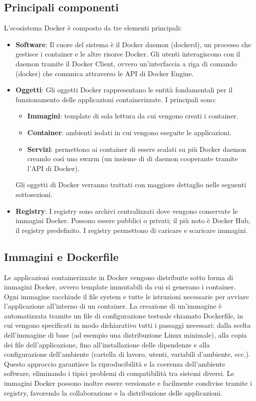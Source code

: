 \subsection{Principali componenti}
\label{sec:principalicomponenti}

L’ecosistema Docker è composto da tre elementi principali:


\begin{itemize}
    \item \textbf{Software}: Il cuore del sistema è il Docker daemon (dockerd), un processo che gestisce i container e le altre risorse Docker. Gli utenti interagiscono con il daemon tramite il Docker Client, ovvero un'interfaccia a riga di comando (docker) che comunica attraverso le API di Docker Engine.
    \item \textbf{Oggetti}: Gli oggetti Docker rappresentano le entità fondamentali per il funzionamento delle applicazioni containerizzate. I principali sono:
    \begin{itemize}
        \item \textbf{Immagini}: template di sola lettura da cui vengono creati i container.
        \item \textbf{Container}: ambienti isolati in cui vengono eseguite le applicazioni.
        \item \textbf{Servizi}: permettono ai container di essere scalati su più Docker daemon creando così uno swarm (un insieme di di daemon cooperante tramite l'API di Docker).
    \end{itemize}
    Gli oggetti di Docker verranno trattati con maggiore dettaglio nelle seguenti sottosezioni.
    \item \textbf{Registry}: I registry sono archivi centralizzati dove vengono conservate le immagini Docker. Possono essere pubblici o privati; il più noto è Docker Hub, il registry predefinito. I registry permettono di caricare e scaricare immagini.
\end{itemize}


\subsection{Immagini e Dockerfile}
\label{sec:immaginiedockerfile}
Le applicazioni containerizzate in Docker vengono distribuite sotto forma di immagini Docker, ovvero template immutabili da cui si generano i container. Ogni immagine racchiude il file system e tutte le istruzioni necessarie per avviare l’applicazione all’interno di un container. La creazione di un’immagine è automatizzata tramite un file di configurazione testuale chiamato Dockerfile, in cui vengono specificati in modo dichiarativo tutti i passaggi necessari: dalla scelta dell’immagine di base (ad esempio una distribuzione Linux minimale), alla copia dei file dell’applicazione, fino all’installazione delle dipendenze e alla configurazione dell’ambiente (cartella di lavoro, utenti, variabili d’ambiente, ecc.). Questo approccio garantisce la riproducibilità e la coerenza dell’ambiente software, eliminando i tipici problemi di compatibilità tra sistemi diversi. Le immagini Docker possono inoltre essere versionate e facilmente condivise tramite i registry, favorendo la collaborazione e la distribuzione delle applicazioni.


